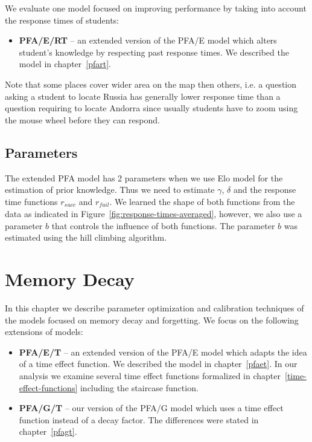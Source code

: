 We evaluate one model focused on improving performance by taking into account the response times of students:

\begin{itemize}
  \item \textbf{PFA/E/RT} -- an extended version of the PFA/E model which alters student's knowledge by respecting past response times. We described the model in chapter~\ref{pfart}.
\end{itemize}

Note that some places cover wider area on the map then others, i.e. a question asking a student to locate Russia has generally lower response time than a question requiring to locate Andorra since usually students have to zoom using the mouse wheel before they can respond.

\subsection{Parameters}
\label{response-parameters}

The extended PFA model has 2 parameters when we use Elo model for the estimation of prior knowledge. Thus we need to estimate $\gamma$, $\delta$ and the response time functions $r_{\mathit{succ}}$ and $r_{\mathit{fail}}$. We learned the shape of both functions from the data as indicated in Figure~\ref{fig:response-times-averaged}, however, we also use a parameter $b$ that controls the influence of both functions. The parameter $b$ was estimated using the hill climbing algorithm.

\section{Memory Decay}

In this chapter we describe parameter optimization and calibration techniques of the models focused on memory decay and forgetting. We focus on the following extensions of models:

\begin{itemize}
  \item \textbf{PFA/E/T} -- an extended version of the PFA/E model which adapts the idea of a time effect function. We described the model in chapter~\ref{pfaet}. In our analysis we examine several time effect functions formalized in chapter~\ref{time-effect-functions} including the staircase function.
  \item \textbf{PFA/G/T} -- our version of the PFA/G model which uses a time effect function instead of a decay factor. The differences were stated in chapter~\ref{pfagt}.
\end{itemize}

